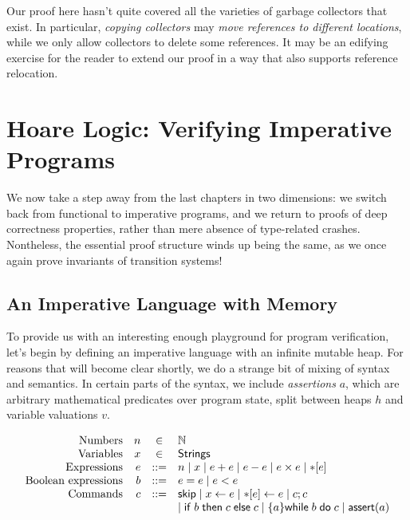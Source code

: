 \documentclass{amsbook}
\theoremstyle{definition}
\theoremstyle{remark}
\numberwithin{section}{chapter}
\numberwithin{equation}{chapter}
\begin{document}
Our proof here hasn't quite covered all the varieties of garbage collectors that exist.
In particular, \emph{copying collectors} may \emph{move references to different locations}, while we only allow collectors to delete some references.
It may be an edifying exercise for the reader to extend our proof in a way that also supports reference relocation.



\chapter{Hoare Logic: Verifying Imperative Programs}

We now take a step away from the last chapters in two dimensions: we switch back from functional to imperative programs, and we return to proofs of deep correctness properties, rather than mere absence of type-related crashes.
Nontheless, the essential proof structure winds up being the same, as we once again prove invariants of transition systems!


\section{An Imperative Language with Memory}

\newcommand{\assert}[1]{\mathsf{assert}(#1)}
\newcommand{\readfrom}[1]{*[#1]}
\newcommand{\writeto}[2]{\readfrom{#1} \leftarrow #2}

To provide us with an interesting enough playground for program verification, let's begin by defining an imperative language with an infinite mutable heap.
For reasons that will become clear shortly, we do a strange bit of mixing of syntax and semantics.
In certain parts of the syntax, we include \emph{assertions} $a$, which are arbitrary mathematical predicates over program state, split between heaps $h$ and variable valuations $v$.

$$\begin{array}{rrcl}
  \textrm{Numbers} & n &\in& \mathbb N \\
  \textrm{Variables} & x &\in& \mathsf{Strings} \\
  \textrm{Expressions} & e &::=& n \mid x \mid e + e \mid e - e \mid e \times e \mid \readfrom{e} \\
  \textrm{Boolean expressions} & b &::=& e = e \mid e < e \\
  \textrm{Commands} & c &::=& \skipe \mid \assign{x}{e} \mid \writeto{e}{e} \mid c; c \\
  &&& \mid \ifte{b}{c}{c} \mid \{a\}\while{b}{c} \mid \assert{a}
\end{array}$$
\end{document}
